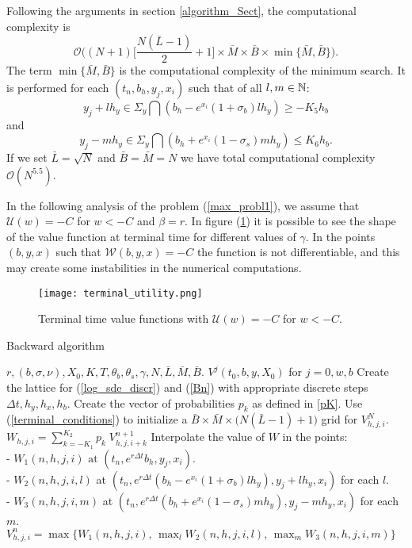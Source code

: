 Following the arguments in section \ref{algorithm_Sect}, the computational complexity is 
$$\mathcal{O}\biggl( (N+1)\bigl[\frac{N(\bar L-1)}{2}+1 \bigr] \times \bar M \times \bar B \times \min\{\bar M, \bar B\} \biggr).$$
The term $\min\{\bar M, \bar B\}$ is the computational complexity of the minimum search. 
It is performed for each $(t_n, b_h,y_j,x_i)$ such that of all $l,m \in \mathbb{N}$:
$$ y_j+l h_y \in \Sigma_y \bigcap (b_h - e^{x_i}(1+\sigma_b)l h_y) \geq -K_5 h_b $$ 
and 
$$y_j-m h_y \in \Sigma_y \bigcap (b_h + e^{x_i}(1-\sigma_s)m h_y) \leq K_6 h_b .$$ 
If we set $\bar L = \sqrt{N}$ and $\bar B = \bar M = N$ we have total computational complexity $\mathcal{O}(N^{5.5})$. 

In the following analysis of the problem (\ref{max_probl1}), we assume that $\mathcal{U}(w) = -C$ for $w < -C$ and $\beta = r$. 
In figure (\ref{Fig21}) it is possible to see the shape of the value function at terminal time for different values of $\gamma$.
In the points $(b,y,x)$ such that $\mathcal{W}(b,y,x) = -C$ the function is not differentiable, and this may create some instabilities in the numerical computations. 

\begin{figure}[t!]
   \centering
   \texttt{[image: terminal\_utility.png]}
   \caption{Terminal time value functions with $\mathcal{U}(w) = -C$ for $w < -C$.}
   \label{Fig21} 
\end{figure}

\begin{algorithm}[H] 
\caption{Backward algorithm}
\label{algo2}
 \begin{algorithmic}[1]
    \REQUIRE $r, (b,\sigma,\nu), X_0, K, T, \theta_b, \theta_s, \gamma, N, \bar L, \bar M, \bar B. $
    \ENSURE $V^j(t_0,b,y,X_0)$ for $j=0,w,b$
      \STATE Create the lattice for (\ref{log_sde_discr}) and (\ref{Bn}) with appropriate discrete steps $\Delta t, h_y, h_x, h_b$.
      \STATE Create the vector of probabilities $p_k$ as defined in \ref{pK}.  
      \STATE Use (\ref{terminal_conditions}) to initialize a $\bar B \times \bar M \times \bigl( N(\bar L-1)+1 \bigl)$ grid for $V^N_{h,j,i}$.  
      \STATE $W_{h,j,i} = \sum_{k = -K_1}^{K_2} p_k \; V^{n+1}_{h,j,i+k}$
      \STATE Interpolate the value of $W$ in the points: \\
             - $W_1(n,h,j,i) \mbox{ at } (t_n, e^{r \Delta t} b_h, y_j, x_i)$.\\
             - $W_2(n,h,j,i,l)$ at $(t_n, e^{r\Delta t}(b_h - e^{x_i}(1+\sigma_b)l h_y), y_j+l h_y, x_i ) $ for each $l$.\\
             - $W_3(n,h,j,i,m)$ at $(t_n, e^{r\Delta t}(b_h + e^{x_i}(1-\sigma_s)m h_y), y_j-m h_y, x_i ) $ for each $m$. 
      \STATE $V^{n}_{h,j,i} = \max \biggl\{ W_1(n,h,j,i), \, \max_l W_2(n,h,j,i,l), \, \max_m W_3(n,h,j,i,m)  \biggr\}$ 
      \ENDFOR
  \end{algorithmic}
\end{algorithm} 

